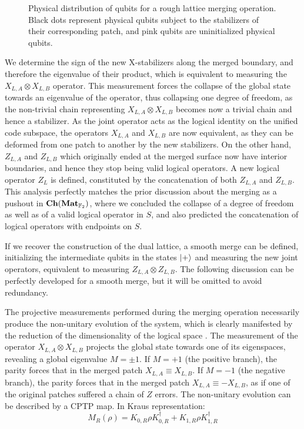 \documentclass[12pt, twoside, openany]{book}
\newcommand{\catname}[1]{{\normalfont\textbf{#1}}}
\newcommand{\Ch}{\catname{Ch}}
\newcommand{\Mat}{\catname{Mat}}
\begin{document}
\begin{figure} [ht]
    \centering
    
    \caption{Physical distribution of qubits for a rough lattice merging operation. Black dots represent physical qubits subject to the stabilizers of their corresponding patch, and pink qubits are uninitialized physical qubits.}
    \label{fig:rough_merging}
\end{figure}

We determine the sign of the new X-stabilizers along the merged boundary, and therefore the eigenvalue of their product, which is equivalent to measuring the $X_{L,A} \otimes X_{L,B}$ operator. This measurement forces the collapse of the global state towards an eigenvalue of the operator, thus collapsing one degree of freedom, as the non-trivial chain representing $X_{L,A} \otimes X_{L,B}$ becomes now a trivial chain and hence a stabilizer. As the joint operator acts as the logical identity on the unified code subspace, the operators $X_{L,A}$ and $X_{L,B}$ are now equivalent, as they can be deformed from one patch to another by the new stabilizers. On the other hand, $Z_{L,A}$ and $Z_{L,B}$ which originally ended at the merged surface now have interior boundaries, and hence they stop being valid logical operators. A new logical operator $Z_L$ is defined, constituted by the concatenation of both $Z_{L,A}$ and $Z_{L,B}$. This analysis perfectly matches the prior discussion about the merging as a pushout in $\Ch(\Mat_{\mathbb{F}_2})$, where we concluded the collapse of a degree of freedom as well as of a valid logical operator in $S$, and also predicted the concatenation of logical operators with endpoints on $S$. 

If we recover the construction of the dual lattice, a smooth merge can be defined, initializing the intermediate qubits in the states $\ket{+}$ and measuring the new joint operators, equivalent to measuring $Z_{L,A} \otimes Z_{L,B}$. The following discussion can be perfectly developed for a smooth merge, but it will be omitted to avoid redundancy.

The projective measurements performed during the merging operation necessarily produce the non-unitary evolution of the system, which is clearly manifested by the reduction of the dimensionality of the logical space \cite{deBeaudrap2020}. The measurement of the operator $X_{L,A} \otimes X_{L,B}$ projects the global state towards one of its eigenspaces, revealing a global eigenvalue $M = \pm 1$. If $M = +1$ (the positive branch), the parity forces that in the merged patch $X_{L,A} \equiv X_{L,B}$. If $M = -1$ (the negative branch), the parity forces that in the merged patch $X_{L,A} \equiv -X_{L,B}$, as if one of the original patches suffered a chain of $Z$ errors. The non-unitary evolution can be described by a CPTP map. In Kraus representation:
\begin{equation}
    M_R(\rho) = K_{0,R} \rho K_{0,R}^\dagger + K_{1,R} \rho K_{1,R}^\dagger 
\end{equation}
\end{document}
